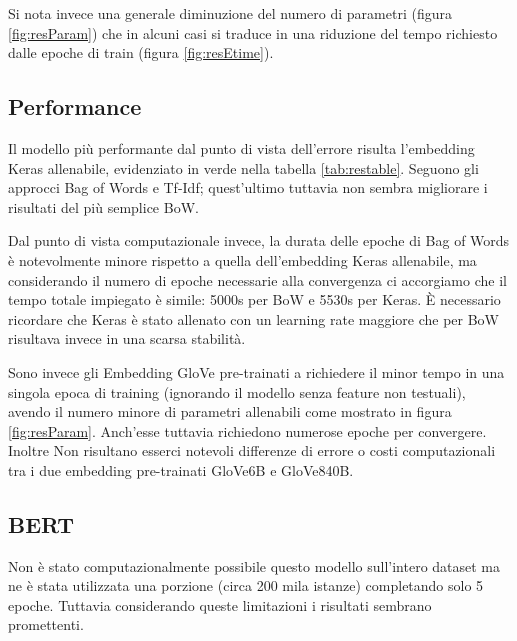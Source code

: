Si nota invece una generale diminuzione del numero di parametri (figura
\ref{fig:resParam}) che in alcuni casi si traduce in una riduzione del tempo
richiesto dalle epoche di train (figura \ref{fig:resEtime}).

\subsection{Performance}
Il modello più performante dal punto di vista dell'errore risulta l'embedding
Keras allenabile, evidenziato in verde nella tabella \ref{tab:restable}. Seguono
gli approcci Bag of Words e Tf-Idf; quest'ultimo tuttavia non sembra migliorare i
risultati del più semplice BoW.

Dal punto di vista computazionale invece, la durata delle epoche di Bag
of Words è notevolmente minore rispetto a quella dell'embedding Keras allenabile,
ma considerando il numero di epoche necessarie alla convergenza ci
accorgiamo che il tempo totale impiegato è simile: 5000s per BoW e 5530s per
Keras. È necessario ricordare che Keras è stato allenato con un learning
rate maggiore che per BoW risultava invece in una scarsa stabilità.

Sono invece gli Embedding GloVe pre-trainati a richiedere il minor tempo in una
singola epoca di training (ignorando il modello senza feature non testuali),
avendo il numero minore di parametri allenabili come mostrato in figura
\ref{fig:resParam}. Anch'esse tuttavia richiedono numerose epoche per
convergere. Inoltre Non risultano esserci notevoli differenze di errore o costi
computazionali tra i due embedding pre-trainati GloVe6B e GloVe840B.

\subsection{BERT}

Non è stato computazionalmente possibile questo modello sull'intero dataset ma
ne è stata utilizzata una porzione (circa 200 mila istanze) completando solo 5
epoche. Tuttavia considerando queste limitazioni i risultati sembrano
promettenti.